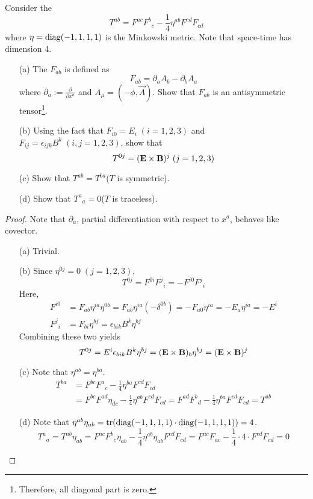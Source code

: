 \documentclass[a4paper, 10pt]{article}
\begin{document}
\newpage


\begin{exer}
    Consider the 
    \[ T^{ab} = F^{ac}F^{b}{}_{c} - \frac{1}{4}\eta^{ab}F^{cd}F_{cd} \]
    where $\eta = \mathrm{diag}(-1,1,1,1)$ is the Minkowski metric. Note that space-time has dimension 4.
    \begin{itemize}
        \item[(a)] The  $F_{ab}$ is defined as
        \[ F_{ab} = \partial_{a}A_{b} - \partial_{b}A_{a} \]
        where $\displaystyle{\partial_{a} := \frac{\partial}{\partial x^{a}}}$ and $A_{\mu} = (-\phi,\vec{A})$. Show that $F_{ab}$ is an antisymmetric tensor\footnote{Therefore, all diagonal part is zero.}.
        \item[(b)] Using the fact that $F_{i0} = E_{i}\;(i=1,2,3)$ and $F_{ij} = \epsilon_{ijk}B^{k}\;(i,j=1,2,3)$, show that
        \[ T^{0j} = (\mathbf{E}\times\mathbf{B})^{j}\;(j=1,2,3) \]
        \item[(c)] Show that $T^{ab} = T^{ba}$($T$ is symmetric).
        \item[(d)] Show that $T^{a}{}_{a} = 0$($T$ is traceless).
    \end{itemize}
\end{exer}
\begin{proof}
    Note that $\partial_{a}$, partial differentiation with respect to $x^{a}$, behaves like covector.
    \begin{itemize}
        \item[(a)] Trivial.
        \item[(b)] Since $\eta^{0j} = 0\;(j=1,2,3)$,
        \[ T^{0j} = F^{0i}F^{j}{}_{i} = -F^{i0}F^{j}{}_{i} \]
        Here,
        \begin{align*}
            F^{i0} &= F_{ab}\eta^{ia}\eta^{0b} = F_{ab}\eta^{ia}(-\delta^{0b})=-F_{a0}\eta^{ia}=-E_{a}\eta^{ia}=-E^{i} \\
            F^{j}{}_{i} &= F_{bi}\eta^{bj} = \epsilon_{bik}B^{k}\eta^{bj}
        \end{align*}
        Combining these two yields
        \[ T^{0j} = E^{i}\epsilon_{bik}B^{k}\eta^{bj} = (\mathbf{E}\times\mathbf{B})_{b}\eta^{bj} = (\mathbf{E}\times\mathbf{B})^{j} \]
        \item[(c)] Note that $\eta^{ab}=\eta^{ba}$.
        \begin{align*}
            T^{ba} &= F^{bc}F^{a}{}_{c} - \frac{1}{4}\eta^{ba}F^{cd}F_{cd} \\
            &= F^{bc}F^{ad}\eta_{dc} - \frac{1}{4}\eta^{ab}F^{cd}F_{cd} = F^{ad}F^{b}{}_{d} - \frac{1}{4}\eta^{ba}F^{cd}F_{cd} = T^{ab}
        \end{align*}
        \item[(d)] Note that $\eta^{ab}\eta_{ab} = \mathrm{tr}(\mathrm{diag}(-1,1,1,1)\cdot\mathrm{diag}(-1,1,1,1)) = 4$.
        \[ T^{a}{}_{a} = T^{ab}\eta_{ab} = F^{ac}F^{b}{}_{c}\eta_{ab} - \frac{1}{4}\eta^{ab}\eta_{ab}F^{cd}F_{cd} = F^{ac}F_{ac}-\frac{1}{4}\cdot 4\cdot F^{cd}F_{cd} = 0 \]
    \end{itemize}
\end{proof}
\end{document}
